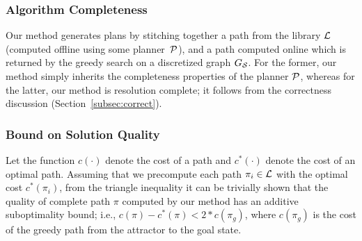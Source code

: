 \documentclass[a4paper,10pt]{article}
\begin{document}
\subsubsection{Algorithm Completeness}
\label{subsec:completeness}
Our method generates plans by stitching together a path from the library $\mathcal{L}$ (computed offline using some planner~$\mathcal{P}$), and a path computed online which is returned by the greedy search on a discretized graph $G_\mathcal{S}$. For the former, our method simply inherits the completeness properties of the planner $\mathcal{P}$, whereas for the latter, our method is resolution complete; it follows from the correctness discussion (Section~\ref{subsec:correct}). 

\subsubsection{Bound on Solution Quality}
\label{subsec:quality}
Let the function $c(\cdot)$ denote the cost of a path and $c^*(\cdot)$ denote the cost of an optimal path. Assuming that we precompute each path $\pi_i \in \mathcal{L}$ with the optimal cost $c^*(\pi_i)$, from the triangle inequality it can be trivially shown that the quality of complete path $\pi$ computed by our method has an additive suboptimality bound; i.e.,
 $c(\pi) - c^*(\pi) < 2 * c(\pi_g)$,
where $c(\pi_g)$ is the cost of the greedy path from the attractor to the goal state.
\end{document}
